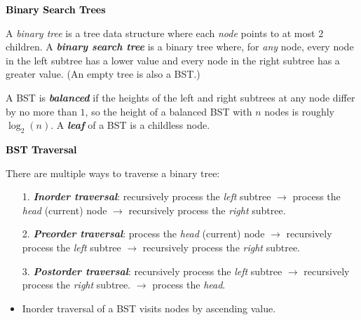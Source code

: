 \documentclass[6.6pt, twocolumn]{extarticle}
\newcommand{\iteminfo}{\item[\textcolor{info}{\scalebox{1.0}{\faInfoCircle}}]}
\newcommand{\blueheader}[1]{\textcolor{black}{\fontsize{7.00pt}{1.0}\bfseries{#1}}\vspace{0.2ex} }
\newcommand{\vocab}[1]{\textcolor{vocabcolor}{\bfseries{\emph{#1}}}}
\begin{document}
   \begin{minipage}[c]{7.3cm} 
   \blueheader{Binary Search Trees}
   
   A \textit{binary tree} is a tree data structure where each \textit{node} points to at most 2 children. A \vocab{binary \textit{search} tree} is a binary tree where, for \textit{any} node, every node in the left subtree has a lower value and every node in the right subtree has a greater value. (An empty tree is also a BST.) \smallskip

    A BST is \vocab{balanced} if the heights of the left and right subtrees at any node differ by no more than $1$, so the height of a balanced BST with $n$ nodes is roughly $\log_2{(n)}$. A \vocab{leaf} of a BST is a childless node.
    \smallskip
   

    \blueheader{BST Traversal}
    
   There are multiple ways to traverse a binary tree:
   \begin{itemize}
       \item[1.] \vocab{Inorder traversal}: recursively process the \textit{left} subtree $\rightarrow$ process the \textit{head} (current) node $\rightarrow$ recursively process the \textit{right} subtree. %
       \item[2.] \vocab{Preorder traversal}: process the \textit{head} (current) node $\rightarrow$ recursively process the \textit{left} subtree $\rightarrow$ recursively process the \textit{right} subtree.
       \item[3.] \vocab{Postorder traversal}: recursively process the \textit{left} subtree $\rightarrow$ recursively process the \textit{right} subtree. $\rightarrow$ process the \textit{head}.
   \end{itemize}

    \begin{itemize}
        \iteminfo Inorder traversal of a BST visits nodes by ascending value. 
    \end{itemize}
    

\end{minipage}
\end{document}
